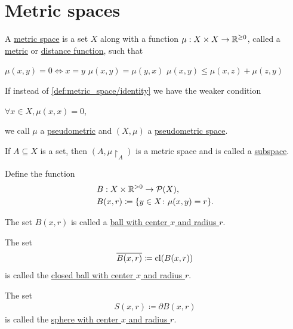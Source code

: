 \section{Metric spaces}\label{sec:metric_spaces}

\begin{definition}\label{def:metric_space}\cite[248]{Engelking1989}
  A \ul{metric space} is a set $X$ along with a function $\mu: X \times X \to \mathbb R^{\geq 0}$, called a \ul{metric} or \ul{distance function}, such that
  \begin{description}
     $\mu(x, y) = 0 \iff x = y$
     $\mu(x, y) = \mu(y, x)$
     $\mu(x, y) \leq \mu(x, z) + \mu(z, y)$
  \end{description}

  If instead of \ref{def:metric_space/identity} we have the weaker condition
  \begin{description}
     $\forall x \in X, \mu(x, x) = 0$,
  \end{description}
  we call $\mu$ a \ul{pseudometric} and $(X, \mu)$ a \ul{pseudometric space}.

  \begin{defenum}
    \item\label{def:metric_space/subspace} If $A \subseteq X$ is a set, then $(A, \mu{\restriction_A})$ is a metric space and is called a \ul{subspace}.

    \item\label{def:metric_space/ball} Define the function
    \begin{align*}
      &B: X \times \mathbb R^{>0} \to \operatorname{\mathcal P}(X), \\
      &B(x, r) \coloneqq \{ y \in X \colon \mu(x, y) = r \}.
    \end{align*}

    The set $B(x, r)$ is called a \ul{ball with center $x$ and radius $r$}.

    \item\label{def:metric_space/closed_ball} The set
    \begin{align*}
      \overline{B(x, r)} \coloneqq \operatorname{cl}(B(x, r))
    \end{align*}
    is called the \ul{closed ball with center $x$ and radius $r$}.

    \item\label{def:metric_space/sphere} The set
    \begin{align*}
      S(x, r) \coloneqq \partial{B(x, r)}
    \end{align*}
    is called the \ul{sphere with center $x$ and radius $r$}.


\end{defenum}
\end{definition}
